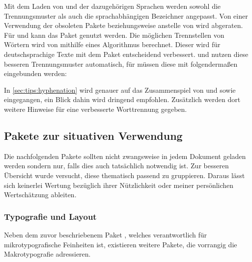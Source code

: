 \begin{DeclarePackages}
  Mit dem Laden von  und der dazugehörigen Sprachen werden 
  sowohl die Trennungsmuster als auch die sprachabhängigen Bezeichner angepasst.
  Von einer Verwendung der obsoleten Pakete  beziehungsweise 
   anstelle von  wird abgeraten. Für 
   und  kann das Paket  
  genutzt werden.
  Die möglichen Trennstellen von Wörtern wird von  mithilfe 
  eines Algorithmus berechnet. Dieser wird für deutschsprachige Texte mit dem 
  Paket  entscheidend verbessert.  und 
   nutzen diese besseren Trennungsmuster automatisch, für 
   müssen diese mit folgendermaßen eingebunden werden:
\begin{quoting}[rightmargin=0pt]
\begin{Code}
\usepackage[ngerman=ngerman-x-latest]{hyphsubst}
\end{Code}
\end{quoting}
  In \autoref{sec:tips:hyphenation} wird genauer auf das Zusammenspiel von 
   und  sowie  eingegangen, 
  ein Blick dahin wird dringend empfohlen. Zusätzlich werden dort weitere 
  Hinweise für eine verbesserte Worttrennung gegeben.
\end{DeclarePackages}



\subsection{Pakete zur situativen Verwendung}
%
Die nachfolgenden Pakete sollten nicht zwangsweise in jedem Dokument geladen 
werden sondern nur, falls dies auch tatsächlich notwendig ist. Zur besseren 
Übersicht wurde versucht, diese thematisch passend zu gruppieren. Daraus lässt 
sich keinerlei Wertung bezüglich ihrer Nützlichkeit oder meiner persönlichen 
Wertschätzung ableiten.



\subsubsection{%
  Typografie und Layout%
}
%
Neben dem zuvor beschriebenem Paket , welches verantwortlich 
für mikrotypografische Feinheiten ist, existieren weitere Pakete, die vorrangig 
die Makrotypografie adressieren.

